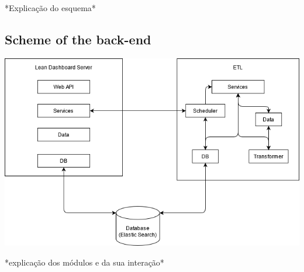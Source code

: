 \documentclass[a4paper,twoside,10pt]{report}
\begin{document}
*Explicação do esquema*

\subsection{Scheme of the back-end}
\begin{center}
    \includegraphics[width=\textwidth]{arquitetura_software.png}
\end{center}
*explicação dos módulos e da sua interação*

\newpage
\end{document}
